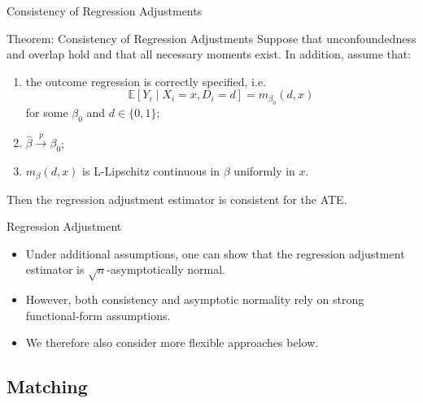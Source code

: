 \documentclass[11pt,aspectratio=169]{beamer}
\begin{document}
\begin{frame}{Consistency of Regression Adjustments}

\begin{theorembox}{Theorem: Consistency of Regression Adjustments}
Suppose that unconfoundedness and overlap hold and that all necessary moments exist. In addition, assume that:
\begin{enumerate}
    \item the outcome regression is correctly specified, i.e.
    $$\mathbb{E}[Y_i \mid X_i = x, D_i = d] = m_{\beta_0}(d, x)$$
    for some $\beta_0$ and $d \in \{0, 1\}$;
    \item $\widehat{\beta} \xrightarrow{p} \beta_0$;
    \item $m_\beta(d, x)$ is L-Lipschitz continuous in $\beta$ uniformly in $x$.
\end{enumerate}

Then the regression adjustment estimator is consistent for the ATE.
\end{theorembox}
\end{frame}


\begin{frame}{Regression Adjustment}

\begin{itemize}
    \item Under additional assumptions, one can show that the regression adjustment estimator is $\sqrt{n}$-asymptotically normal.
    \item However, both consistency and asymptotic normality rely on strong functional-form assumptions.
    \item We therefore also consider more flexible approaches below.
\end{itemize}

\end{frame}


\begin{frame}


\end{frame}









\subsection{Matching}
\end{document}
